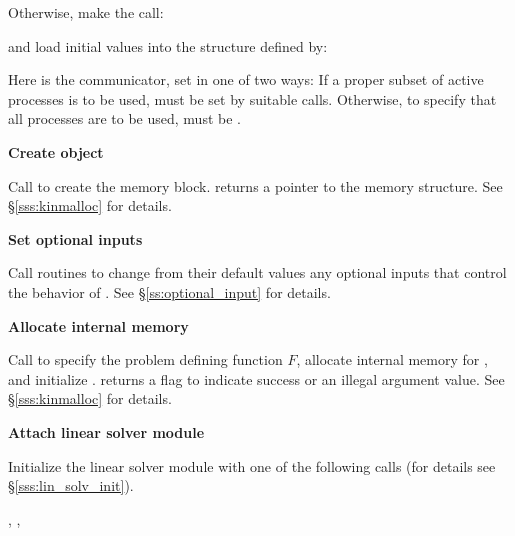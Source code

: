 \begin{Steps}
  Otherwise, make the call:

  {\s} 

  {\omp} 

  {\pt} 

  {\p} 

  and load initial values into the structure defined by:

  {\s} 

  {\omp} 

  {\pt} 

  {\p} 

  Here  is the {\mpi} communicator, set in one of two ways: 
  If a proper subset of active processes is to be used,  
  must be set by suitable {\mpi} calls. Otherwise, to specify that all 
  processes are to be used,  must be .
  
\item\label{i:kinsol_create} 
  {\bf Create {\kinsol} object}

  Call  to create the {\kinsol} memory block.
   returns a pointer to the {\kinsol} memory structure.
  See \S\ref{sss:kinmalloc} for details.

\item
  {\bf Set optional inputs}

  Call  routines to change from their default values any
  optional inputs that control the behavior of {\kinsol}.
  See \S\ref{ss:optional_input} for details.

\item\label{i:kinsol_malloc} 
  {\bf Allocate internal memory}

  Call  
  to specify the problem defining function $F$,
  allocate internal memory for {\kinsol}, 
  and initialize {\kinsol}.
   returns a flag to indicate success or an illegal argument value.
  See \S\ref{sss:kinmalloc} for details.

\item\label{i:lin_solver} 
  {\bf Attach linear solver module}

  Initialize the linear solver module with one of the following calls
  (for details see \S\ref{sss:lin_solv_init}).

  {\s, \omp, \pt} 


\end{Steps}
